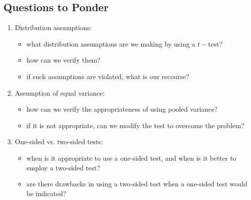 \subsection{Questions to Ponder}
\begin{enumerate}
    \item Distribution assumptions:
    \begin{itemize}[noitemsep]
        \item what distribution assumptions are we making by using a $t-$test?
        \item how can we verify them?
        \item if such assumptions are violated, what is our recourse?
    \end{itemize}
    \item Assumption of equal variance:
    \begin{itemize}[noitemsep]
        \item how can we verify the appropriateness of using pooled variance?
        \item if it is not appropriate, can we modify the test to overcome the problem?
    \end{itemize}
    \item One-sided vs. two-sided tests:
    \begin{itemize}[noitemsep]
        \item when is it appropriate to use a one-sided test, and when is it better to employ a two-sided test?
        \item are there drawbacks in using a two-sided test when a one-sided test would be indicated?
    \end{itemize}
\end{enumerate}

